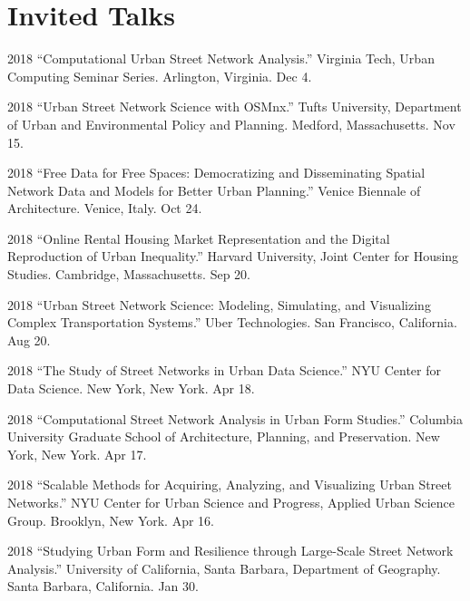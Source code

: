\documentclass[12pt,letterpaper]{report}
\begin{document}
	
	
	\section*{Invited Talks}
	
	\begin{tablist}
		
		\item[2018] \tab \enquote{Computational Urban Street Network Analysis.} Virginia Tech, Urban Computing Seminar Series. Arlington, Virginia. Dec 4.
		
		\item[2018] \tab \enquote{Urban Street Network Science with OSMnx.} Tufts University, Department of Urban and Environmental Policy and Planning. Medford, Massachusetts. Nov 15.
		
		\item[2018] \tab \enquote{Free Data for Free Spaces: Democratizing and Disseminating Spatial Network Data and Models for Better Urban Planning.} Venice Biennale of Architecture. Venice, Italy. Oct 24.
		
		\item[2018] \tab \enquote{Online Rental Housing Market Representation and the Digital Reproduction of Urban Inequality.} Harvard University, Joint Center for Housing Studies. Cambridge, Massachusetts. Sep 20.
		
		\item[2018] \tab \enquote{Urban Street Network Science: Modeling, Simulating, and Visualizing Complex Transportation Systems.} Uber Technologies. San Francisco, California. Aug 20.
		
		\item[2018] \tab \enquote{The Study of Street Networks in Urban Data Science.} NYU Center for Data Science. New York, New York. Apr 18.
		
		\item[2018] \tab \enquote{Computational Street Network Analysis in Urban Form Studies.} Columbia University Graduate School of Architecture, Planning, and Preservation. New York, New York. Apr 17.
		
		\item[2018] \tab \enquote{Scalable Methods for Acquiring, Analyzing, and Visualizing Urban Street Networks.} NYU Center for Urban Science and Progress, Applied Urban Science Group. Brooklyn, New York. Apr 16.
		
		\item[2018] \tab \enquote{Studying Urban Form and Resilience through Large-Scale Street Network Analysis.} University of California, Santa Barbara, Department of Geography. Santa Barbara, California. Jan 30.
		

\end{tablist}
\end{document}
